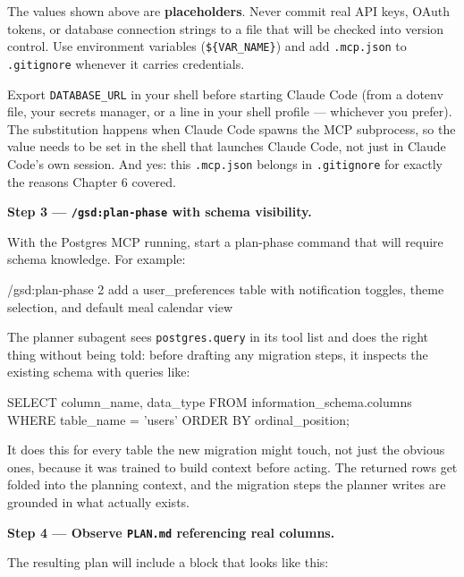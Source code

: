 \documentclass[11pt,letterpaper,openany]{book}
\newcommand{\credentialwarning}{%
\begin{gsdwarning}[Credential Safety]
The values shown above are \textbf{placeholders}. Never commit real API keys,
OAuth tokens, or database connection strings to a file that will be checked
into version control. Use environment variables (\texttt{\$\{VAR\_NAME\}}) and
add \texttt{.mcp.json} to \texttt{.gitignore} whenever it carries credentials.
\end{gsdwarning}%
}
\begin{document}
\begin{gsdscenario}

\credentialwarning

Export \texttt{DATABASE\_URL} in your shell before starting Claude
Code (from a dotenv file, your secrets manager, or a line in your
shell profile --- whichever you prefer). The substitution happens
when Claude Code spawns the MCP subprocess, so the value needs to be
set in the shell that launches Claude Code, not just in Claude Code's
own session. And yes: this \texttt{.mcp.json} belongs in
\texttt{.gitignore} for exactly the reasons Chapter 6 covered.

\vspace{6pt}
\textbf{Step 3 --- \texttt{/gsd:plan-phase} with schema visibility.}
\vspace{4pt}

With the Postgres MCP running, start a plan-phase command that will
require schema knowledge. For example:

\begin{gsdbash}
/gsd:plan-phase 2 add a user_preferences table with notification
  toggles, theme selection, and default meal calendar view
\end{gsdbash}

The planner subagent sees \texttt{postgres.query} in its tool list
and does the right thing without being told: before drafting any
migration steps, it inspects the existing schema with queries like:

\begin{gsdplain}
SELECT column_name, data_type
FROM information_schema.columns
WHERE table_name = 'users'
ORDER BY ordinal_position;
\end{gsdplain}

It does this for every table the new migration might touch, not just
the obvious ones, because it was trained to build context before
acting. The returned rows get folded into the planning context, and
the migration steps the planner writes are grounded in what actually
exists.

\vspace{6pt}
\textbf{Step 4 --- Observe \texttt{PLAN.md} referencing real columns.}
\vspace{4pt}

The resulting plan will include a block that looks like this:


\end{gsdscenario}
\end{document}
